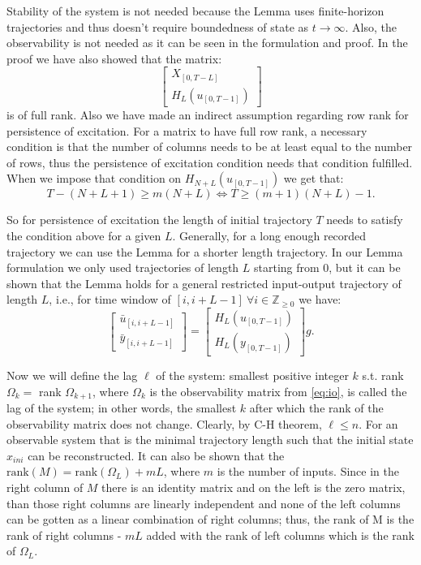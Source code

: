 \documentclass[12pt,a4paper]{report}
\begin{document}
Stability of the system is not needed because the Lemma uses finite-horizon trajectories and thus doesn't require boundedness of state as $t \to \infty$. Also, the observability
is not needed as it can be seen in the formulation and proof. In the proof we have also showed that the matrix:
\[\begin{bmatrix} X_{[0, T-L]} \\ H_{L}(u_{[0, T-1]})\end{bmatrix}\]
is of full rank. Also we have made an indirect assumption regarding row rank for persistence of excitation. For a matrix to have full row rank, a necessary condition is that the number of columns needs to be at least equal to the
number of rows, thus the persistence of excitation condition needs that condition fulfilled. When we impose that condition on $H_{N+L}(u_{[0, T-1]})$ we get that:
\begin{equation}
    T - (N + L + 1) \geq m(N+L) \iff T \geq (m+1)(N+L) - 1.
    \label{eq:length}
\end{equation}

So for persistence of excitation the length of initial trajectory $T$ needs to satisfy the condition above for a given $L$. Generally, for a long enough recorded trajectory we can use the Lemma
for a shorter length trajectory. In our Lemma formulation we only used trajectories of length $L$ starting from 0, but it can be shown that the Lemma holds for a general restricted
input-output trajectory of length $L$, i.e., for time window of $[i, i + L -1] \ \forall i \in \mathbb{Z}_{\geq 0}$ we have:
\begin{equation}
    \begin{bmatrix} \bar{u}_{[i, i+L-1]} \\ \bar{y}_{[i, i+L-1]} \end{bmatrix} = \begin{bmatrix} H_{L}(u_{[0, T-1]}) \\ H_{L}(y_{[0, T-1]})\end{bmatrix}g.
    \label{eq:fl-i}
\end{equation}

Now we will define the lag \label{lag} $\ell$ of the system: smallest positive integer $k$ s.t. rank \(\Omega_k = \) rank \(\Omega_{k+1}\), where $\Omega_k$ is the observability matrix from
\eqref{eq:io}, is called the lag of the system; in other words, the smallest $k$ after which the rank of the observability matrix does not change. Clearly, by C-H theorem, $\ell \leq n$. For an observable system that is the minimal trajectory length such that the initial state
$x_{ini}$ can be reconstructed. It can also be shown that the \(\mbox{rank}(M) = \mbox{rank}(\Omega_L) + mL\), where $m$ is the number of inputs. Since in the right column of $M$ there is an identity matrix
and on the left is the zero matrix, than those right columns are linearly independent and none of the left columns can be gotten as a linear combination of right columns; thus, the rank of M is the rank of right columns - $mL$ added
with the rank of left columns which is the rank of $\Omega_L$.
\newpage
\end{document}
